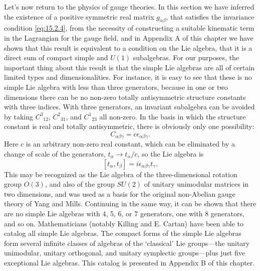 Let's now return to the physics of gauge theories. In this section we have
inferred the existence of a positive symmetric real matrix $g_{\alpha\beta}$,
that satisfies the invariance condition \eqref{eq:15.2.4}, from the necessity of
constructing a suitable kinematic term in the Lagrangian for the gauge field, and
in Appendix A of this chapter we have shown that this result is equivalent to a
condition on the Lie algebra, that it is a direct sum of compact simple and
$U(1)$ subalgebras. For our purposes, the important thing about this result is
that the simple Lie algebras are all of certain limited types and dimensionalities.
For instance, it is easy to see that these is no simple Lie algebra with less than
three generators, because in one or two dimensions there can be no non-zero
totally antisymmetric structure constants with three indices. With three
generators, an invariant subalgebra can be avoided by taking $C^3{}_{12}$,
$C^2{}_{31}$, and $C^1{}_{23}$ all non-zero. In the basis in which the structure
constant is real and totally antisymmetric, there is obviously only one
possibility:
\[
 C_{\alpha\beta\gamma}=c\epsilon_{\alpha\beta\gamma} .
\]
Here $c$ is an arbitrary non-zero real constant, which can be eliminated by a
change of scale of the generators, $t_\alpha\longrightarrow t_\alpha/c$, so the
Lie algebra is
\[
 [t_\alpha,t_\beta]=i\epsilon_{\alpha\beta\gamma}t_\gamma .
\]
This may be recognized as the Lie algebra of the three-dimensional rotation group
$O(3)$, and also of the group $SU(2)$ of unitary unimodular matrices in two
dimensions, and was used as a basis for the original non-Abelian gauge theory of
Yang and Mills. Continuing in the same way, it can be shown that there are no
simple Lie algebras with 4, 5, 6, or 7 generators, one with 8 generators, and so
on. Mathematicians (notably Killing and E. Cartan) have been able to catalog all
simple Lie algebras. The compact forms of the simple Lie algebras form several
infinite classes of algebras of the `classical' Lie groups---the unitary
unimodular, unitary orthogonal, and unitary symplectic groups---plus just five
exceptional Lie algebras. This catalog is presented in Appendix B of this chapter.

